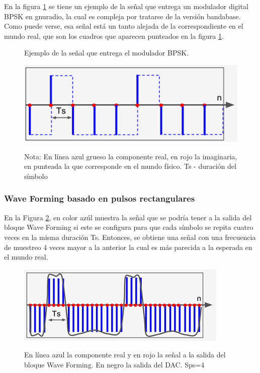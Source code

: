 En la figura \ref{fig:BPSK} se tiene un ejemplo de la señal que entrega un modulador digital BPSK en gnuradio, la cual es compleja por tratarse de la versión bandabase. Como puede verse, esa señal está un tanto alejada de la correspondiente en el mundo real, que son los cuadros que aparecen punteados en la figura  \ref{fig:BPSK}. 

\vspace{200px}
\begin{figure}[h!]
	\captionsetup{justification = raggedright, singlelinecheck = false}
	\caption{Ejemplo de la señal que entrega el modulador BPSK.} 
	\centering
	\includegraphics[scale=1]{Imagenes/BPSK.png}
	\label{fig:BPSK}
		\caption*{Nota: En línea azul grueso la componente real, en rojo la imaginaria, en punteada la que corresponde en el mundo físico. Ts - duración del símbolo}
\end{figure}
\subsubsection{Wave Forming basado en pulsos rectangulares}
En la Figura \ref{fig:Azul}, en color azúl muestra la señal que se podría tener a la salida del bloque Wave Forming si este se configura para que cada símbolo se repita cuatro veces en la misma duración Ts. Entonces, se obtiene una señal con una frecuencia de muestreo 4 veces mayor a la anterior la cual es más parecida a la esperada en el mundo real. \\

\begin{figure}[h!]
	\captionsetup{justification = raggedright, singlelinecheck = false}
	\caption{En línea azul la componente real y en rojo la señal a la salida del bloque Wave Forming. En negro la salida del DAC. Sps=4} 
	\centering
	\includegraphics[scale=1]{Imagenes/Azul.png}
	\label{fig:Azul}
\end{figure}

